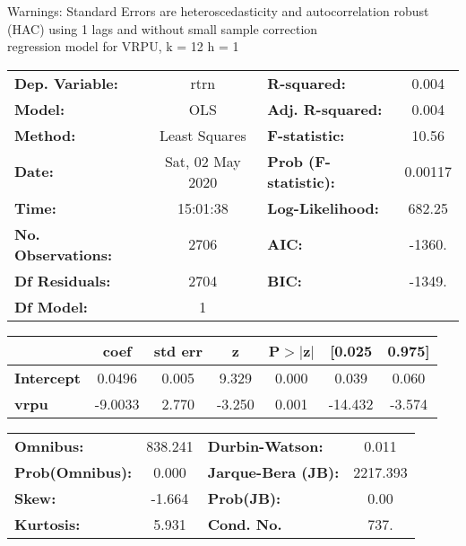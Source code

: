 Warnings: \newline
 [1] Standard Errors are heteroscedasticity and autocorrelation robust (HAC) using 1 lags and without small sample correction\\ 

regression model for VRPU, k = 12 h = 1\begin{center}
\begin{tabular}{lclc}
\toprule
\textbf{Dep. Variable:}    &       rtrn       & \textbf{  R-squared:         } &     0.004   \\
\textbf{Model:}            &       OLS        & \textbf{  Adj. R-squared:    } &     0.004   \\
\textbf{Method:}           &  Least Squares   & \textbf{  F-statistic:       } &     10.56   \\
\textbf{Date:}             & Sat, 02 May 2020 & \textbf{  Prob (F-statistic):} &  0.00117    \\
\textbf{Time:}             &     15:01:38     & \textbf{  Log-Likelihood:    } &    682.25   \\
\textbf{No. Observations:} &        2706      & \textbf{  AIC:               } &    -1360.   \\
\textbf{Df Residuals:}     &        2704      & \textbf{  BIC:               } &    -1349.   \\
\textbf{Df Model:}         &           1      & \textbf{                     } &             \\
\bottomrule
\end{tabular}
\begin{tabular}{lcccccc}
                   & \textbf{coef} & \textbf{std err} & \textbf{z} & \textbf{P$> |$z$|$} & \textbf{[0.025} & \textbf{0.975]}  \\
\midrule
\textbf{Intercept} &       0.0496  &        0.005     &     9.329  &         0.000        &        0.039    &        0.060     \\
\textbf{vrpu}      &      -9.0033  &        2.770     &    -3.250  &         0.001        &      -14.432    &       -3.574     \\
\bottomrule
\end{tabular}
\begin{tabular}{lclc}
\textbf{Omnibus:}       & 838.241 & \textbf{  Durbin-Watson:     } &    0.011  \\
\textbf{Prob(Omnibus):} &   0.000 & \textbf{  Jarque-Bera (JB):  } & 2217.393  \\
\textbf{Skew:}          &  -1.664 & \textbf{  Prob(JB):          } &     0.00  \\
\textbf{Kurtosis:}      &   5.931 & \textbf{  Cond. No.          } &     737.  \\
\bottomrule
\end{tabular}
\end{center}

